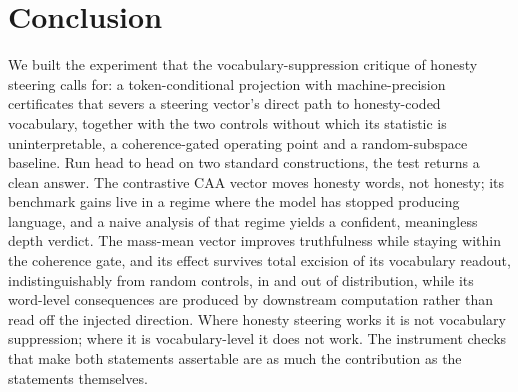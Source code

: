 \section{Conclusion}\label{sec:conclusion}

We built the experiment that the vocabulary-suppression critique of honesty steering calls for: a token-conditional projection with machine-precision certificates that severs a steering vector's direct path to honesty-coded vocabulary, together with the two controls without which its statistic is uninterpretable, a coherence-gated operating point and a random-subspace baseline. Run head to head on two standard constructions, the test returns a clean answer. The contrastive CAA vector moves honesty words, not honesty; its benchmark gains live in a regime where the model has stopped producing language, and a naive analysis of that regime yields a confident, meaningless depth verdict. The mass-mean vector improves truthfulness while staying within the coherence gate, and its effect survives total excision of its vocabulary readout, indistinguishably from random controls, in and out of distribution, while its word-level consequences are produced by downstream computation rather than read off the injected direction. Where honesty steering works it is not vocabulary suppression; where it is vocabulary-level it does not work. The instrument checks that make both statements assertable are as much the contribution as the statements themselves.
